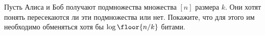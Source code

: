 Пусть Алиса и Боб получают подмножества множества $[n]$ размера $k$. Они хотят понять пересекаются ли эти
подмножества или нет. Покажите, что для этого им необходимо обменяться хотя бы $\log \floor{n /
k}$ битами.